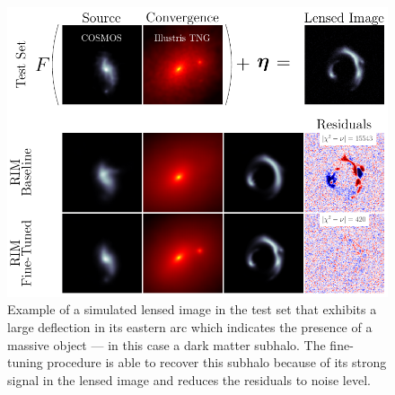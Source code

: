 \begin{figure}[tb!]
       \centering 
       \includegraphics[width=0.7\linewidth]{figures/main_figurev2}
       \caption{Example of a simulated lensed image in the test set that 
exhibits a large deflection in its eastern arc which indicates the presence of a massive object
 --- in this case a dark matter subhalo. The fine-tuning procedure is able to recover 
this subhalo because of its strong signal in the lensed image and reduces the residuals 
to noise level.}
       \label{fig:main figure}
\end{figure}


